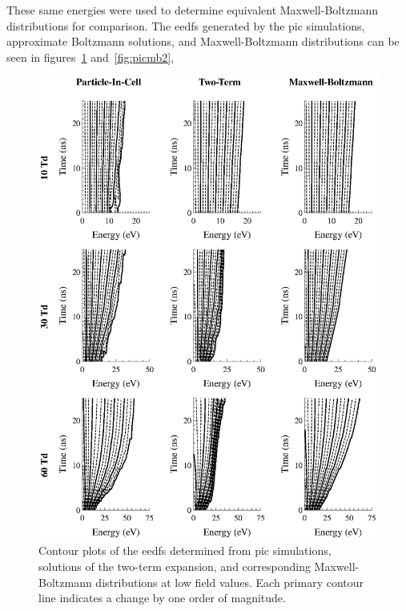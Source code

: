 These same energies were used to determine equivalent Maxwell-Boltzmann
distributions for comparison. The \acs{eedf}s generated by the \acs{pic}
simulations, approximate Boltzmann solutions, and Maxwell-Boltzmann
distributions can be seen in figures~\ref{fig:picmb1} and~\ref{fig:picmb2},
\begin{figure}
  \centering
  \includegraphics{./chapters/modeling/figures/picmb1.eps}
  \caption{Contour plots of the \acs{eedf}s determined from \acs{pic}
    simulations, solutions of the two-term expansion, and corresponding
    Maxwell-Boltzmann distributions at low field values. Each primary contour
    line indicates a change by one order of magnitude.}
  \label{fig:picmb1}
\end{figure}
